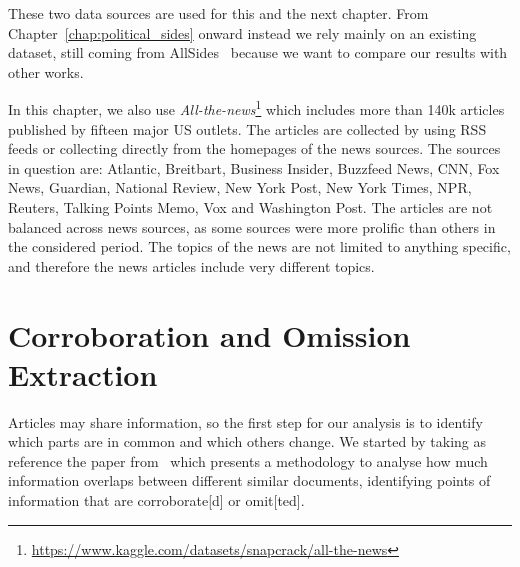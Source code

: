 

These two data sources are used for this and the next chapter. From Chapter~\ref{chap:political_sides} onward instead we rely mainly on an existing dataset, still coming from AllSides~\citep{baly2020we} because we want to compare our results with other works.

In this chapter, we also use \emph{All-the-news}\footnote{\url{https://www.kaggle.com/datasets/snapcrack/all-the-news}} which includes more than 140k articles published by fifteen major US outlets.
The articles are collected by using RSS feeds or collecting directly from the homepages of the news sources. The sources in question are: Atlantic, Breitbart, Business Insider, Buzzfeed News, CNN, Fox News, Guardian, National Review, New York Post, New York Times, NPR, Reuters, Talking Points Memo, Vox and Washington Post.
The articles are not balanced across news sources, as some sources were more prolific than others in the considered period.
The topics of the news are not limited to anything specific, and therefore the news articles include very different topics.


\section{\statusgreen Corroboration and Omission Extraction}
\label{sec:cgs_cross_referencing}
Articles may share information, so the first step for our analysis is to identify which parts are in common and which others change.
We started by taking as reference the paper from~\citet{bountouridis2018explaining} which presents a methodology to analyse how much information overlaps between different similar documents, identifying points of information that are \gls{corroborate}[d] or \gls{omit}[ted].


